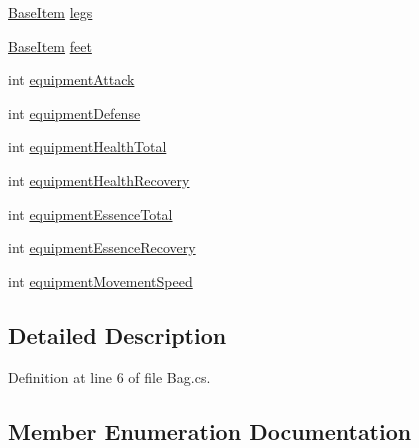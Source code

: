 \begin{DoxyCompactItemize}
\mbox{\hyperlink{class_base_item}{Base\+Item}} \mbox{\hyperlink{class_bag_a06fc81d3974eb764db9be3fda8e63284}{legs}}
\item 
\mbox{\hyperlink{class_base_item}{Base\+Item}} \mbox{\hyperlink{class_bag_a45172ef71e457ce9c818866fc0ffd5c2}{feet}}
\item 
int \mbox{\hyperlink{class_bag_a009c51f2adf7e0dbddd0bcc97fee8708}{equipment\+Attack}}
\item 
int \mbox{\hyperlink{class_bag_ade9d98eb07c941f15f1bf40eaa67523f}{equipment\+Defense}}
\item 
int \mbox{\hyperlink{class_bag_a27e5f9ef8f024e1d1cf5d321cb28836c}{equipment\+Health\+Total}}
\item 
int \mbox{\hyperlink{class_bag_a38d2f92304d56781de31a7098695ac72}{equipment\+Health\+Recovery}}
\item 
int \mbox{\hyperlink{class_bag_a623cd2a1f6198424405ad8066ca6025e}{equipment\+Essence\+Total}}
\item 
int \mbox{\hyperlink{class_bag_a79e24ed265181b438682a9fbc6cc37a6}{equipment\+Essence\+Recovery}}
\item 
int \mbox{\hyperlink{class_bag_ad551aa1b82517235b92383220f44ed4c}{equipment\+Movement\+Speed}}
\end{DoxyCompactItemize}


\subsection{Detailed Description}


Definition at line 6 of file Bag.\+cs.



\subsection{Member Enumeration Documentation}
\mbox{\label{class_bag_a5a827c44705d57202edc93b9a39316c7}} 
